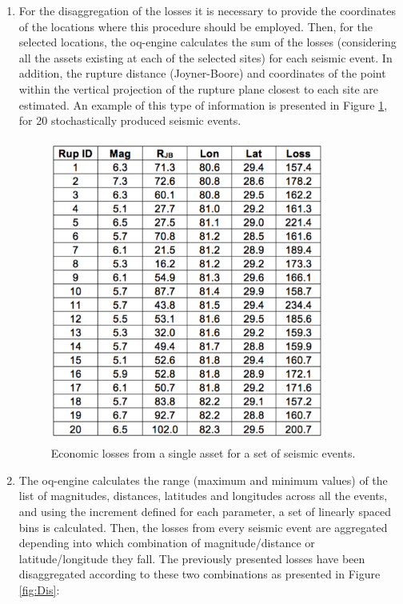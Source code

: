 \begin{enumerate}

\item For the disaggregation of the losses it is necessary to provide the coordinates of the locations where this procedure should be employed. Then, for the selected locations, the oq-engine calculates the sum of the losses (considering all the assets existing at each of the selected sites) for each seismic event. In addition, the rupture distance (Joyner-Boore) and coordinates of the point within the vertical projection of the rupture plane closest to each site are estimated. An example of this type of information is presented in Figure \ref{fig:SetLosses}, for 20 stochastically produced seismic events.

\begin{figure}[ht]
\centering
\includegraphics[width=9cm,height=10cm]{./figures/risk/SetLosses.eps} 
\caption{Economic losses from a single asset for a set of seismic events.}
\label{fig:SetLosses}
\end{figure} 

\item The oq-engine calculates the range (maximum and minimum values) of the list of magnitudes, distances, latitudes and longitudes across all the events, and using the increment defined for each parameter, a set of linearly spaced bins is calculated. Then, the losses from every seismic event are aggregated depending into which combination of magnitude/distance or latitude/longitude they fall. The previously presented losses have been disaggregated according to these two combinations as presented in Figure \ref{fig:Dis}:


\end{enumerate}
